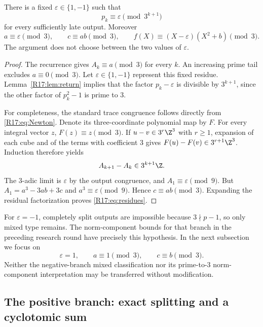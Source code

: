 \documentclass[11pt,a4paper]{article}
\theoremstyle{definition}\newtheorem{definition}[theorem]{Definition}
\theoremstyle{remark}\newtheorem{remark}[theorem]{Remark}
\begin{document}
\begin{proposition}
\label{R17:prop:sign}
There is a fixed $\varepsilon\in\{1,-1\}$ such that
\[
 p_k\equiv\varepsilon\pmod{3^{k+1}}
\]
for every sufficiently late output. Moreover
\begin{equation}\label{R17:eq:residues}
 a\equiv\varepsilon\pmod3,\qquad c\equiv ab\pmod3,
 \qquad f(X)\equiv(X-\varepsilon)(X^2+b)\pmod3.
\end{equation}
The argument does not choose between the two values of $\varepsilon$.
\end{proposition}
\begin{proof}
The recurrence gives $A_k\equiv a\pmod3$ for every $k$.
An increasing prime tail excludes $a\equiv0\pmod3$. Let
$\varepsilon\in\{1,-1\}$ represent this fixed residue.
Lemma~\ref{R17:lem:return} implies that the factor $p_k-\varepsilon$
is divisible by $3^{k+1}$, since the other factor of $p_k^2-1$ is
prime to $3$.

For completeness, the standard trace congruence follows directly from
\eqref{R17:eq:Newton}. Denote its three-coordinate polynomial map by $F$.
For every integral vector $z$, $F(z)\equiv z\pmod3$.
If $u-v\in3^r\Z^3$ with $r\ge1$, expansion of each cube and of the
terms with coefficient $3$ gives
$F(u)-F(v)\in3^{r+1}\Z^3$. Induction therefore yields
\[
 A_{k+1}-A_k\in3^{k+1}\Z.
\]
The $3$-adic limit is $\varepsilon$ by the output congruence, and
$A_1\equiv\varepsilon\pmod9$. But
$A_1=a^3-3ab+3c$ and $a^3\equiv\varepsilon\pmod9$.
Hence $c\equiv ab\pmod3$. Expanding the residual factorization proves
\eqref{R17:eq:residues}.
\end{proof}

For $\varepsilon=-1$, completely split outputs are impossible because
$3\nmid p-1$, so only mixed type remains. The norm-component bounds
for that branch in the preceding research round have precisely this
hypothesis. In the next subsection we focus on
\begin{equation}\label{R17:eq:positive}
 \varepsilon=1,\qquad a\equiv1\pmod3,
 \qquad c\equiv b\pmod3.
\end{equation}
Neither the negative-branch mixed classification nor its prime-to-$3$
norm-component interpretation may be transferred without modification.

\subsection{The positive branch: exact splitting and a cyclotomic sum}
\end{document}
